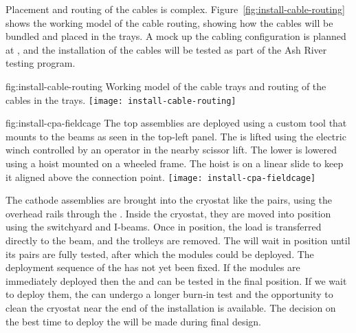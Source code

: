 Placement and routing of %
the cables %
is complex. Figure~\ref{fig:install-cable-routing} shows the working \threed model of the cable routing, showing how the cables will be bundled and placed in the trays. A mock up the cabling configuration is planned at , and the installation of the cables will be tested as part of the Ash River testing program.

\begin{dunefigure}{fig:install-cable-routing}
  {Working model of the cable trays and routing of the  cables in the trays.}
\texttt{[image: install-cable-routing]}
\end{dunefigure}


\begin{dunefigure}{fig:install-cpa-fieldcage}
  {The top  assemblies are deployed using a custom tool that mounts to the  beams as seen in the top-left panel. The   is lifted using the electric winch controlled by an operator in the nearby scissor lift. The lower   is lowered using a hoist mounted on a wheeled frame. The hoist is on a linear slide to keep it aligned above the connection point.}
\texttt{[image: install-cpa-fieldcage]}
\end{dunefigure}

The cathode  assemblies are brought into the cryostat like the  pairs, using the overhead rails through the . Inside the cryostat, they are moved into position using the  switchyard and  I-beams. 
Once in position, the load is transferred directly to the  beam, and the trolleys are removed. 
The  will wait in position until its  pairs are fully tested, after which %
the  modules could be deployed. 
The deployment sequence of the  has not yet been fixed. 
If the  modules are immediately deployed then the  and  can be tested in the final position. 
If we wait to deploy them, %
the  can undergo a longer burn-in test and the opportunity to clean the cryostat near the end of the installation is available. The decision on the best time to deploy the  will be made during final design.

